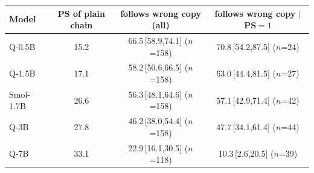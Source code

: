 \begin{tabular}{lccc}
\toprule
Model & PS of plain chain & follows wrong copy (all) & follows wrong copy $\mid$ PS$=1$ \\
\midrule
Q-0.5B & 15.2 & 66.5\,{\scriptsize[58.9,74.1]} ($n$=158) & 70.8\,{\scriptsize[54.2,87.5]} ($n$=24) \\
Q-1.5B & 17.1 & 58.2\,{\scriptsize[50.6,66.5]} ($n$=158) & 63.0\,{\scriptsize[44.4,81.5]} ($n$=27) \\
Smol-1.7B & 26.6 & 56.3\,{\scriptsize[48.1,64.6]} ($n$=158) & 57.1\,{\scriptsize[42.9,71.4]} ($n$=42) \\
Q-3B & 27.8 & 46.2\,{\scriptsize[38.0,54.4]} ($n$=158) & 47.7\,{\scriptsize[34.1,61.4]} ($n$=44) \\
Q-7B & 33.1 & 22.9\,{\scriptsize[16.1,30.5]} ($n$=118) & 10.3\,{\scriptsize[2.6,20.5]} ($n$=39) \\
\bottomrule
\end{tabular}
